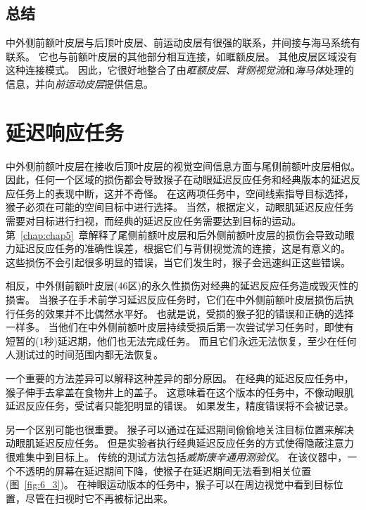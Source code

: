 \subsection{总结}

中外侧前额叶皮层与后顶叶皮层、前运动皮层有很强的联系，并间接与海马系统有联系。
它也与前额叶皮层的其他部分相互连接，如眶额皮层。
其他皮层区域没有这种连接模式。
因此，它很好地整合了由\textit{眶额皮层}、\textit{背侧视觉流}和\textit{海马体}处理的信息，并向\textit{前运动皮层}提供信息。



\section{延迟响应任务}

中外侧前额叶皮层在接收后顶叶皮层的视觉空间信息方面与尾侧前额叶皮层相似。
因此，任何一个区域的损伤都会导致猴子在动眼延迟反应任务和经典版本的延迟反应任务上的表现中断，这并不奇怪。
在这两项任务中，空间线索指导目标选择，猴子必须在可能的空间目标中进行选择。
当然，根据定义，动眼肌延迟反应任务需要对目标进行扫视，而经典的延迟反应任务需要达到目标的运动。
第~\ref{chap:chap5}~章解释了尾侧前额叶皮层和后外侧前额叶皮层的损伤会导致动眼力延迟反应任务的准确性误差，根据它们与背侧视觉流的连接，这是有意义的。
这些损伤不会引起很多明显的错误，当它们发生时，猴子会迅速纠正这些错误\cite{tsujimoto2012prefrontal}。


相反，中外侧前额叶皮层(46区)的永久性损伤对经典的延迟反应任务造成毁灭性的损害。
当猴子在手术前学习延迟反应任务时，它们在中外侧前额叶皮层损伤后执行任务的效果并不比偶然水平好\cite{goldman1978prenatal}。
也就是说，受损的猴子犯的错误和正确的选择一样多。
当他们在中外侧前额叶皮层持续受损后第一次尝试学习任务时，即使有短暂的(1秒)延迟期，他们也无法完成任务\cite{battig1960comparison}。
而且它们永远无法恢复，至少在任何人测试过的时间范围内都无法恢复。


一个重要的方法差异可以解释这种差异的部分原因。
在经典的延迟反应任务中，猴子伸手去拿盖在食物井上的盖子。
这意味着在这个版本的任务中，不像动眼肌延迟反应任务，受试者只能犯明显的错误。
如果发生，精度错误将不会被记录。


另一个区别可能也很重要。
猴子可以通过在延迟期间偷偷地关注目标位置来解决动眼肌延迟反应任务。
但是实验者执行经典延迟反应任务的方式使得隐蔽注意力很难集中到目标上。
传统的测试方法包括\textit{威斯康辛通用测验仪}。
在该仪器中，一个不透明的屏幕在延迟期间下降，使猴子在延迟期间无法看到相关位置(图~\ref{fig:6_3})。
在神眼运动版本的任务中，猴子可以在周边视觉中看到目标位置，尽管在扫视时它不再被标记出来。



